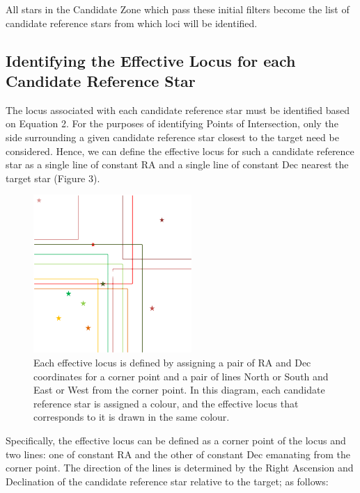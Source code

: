 \documentclass[]{elsarticle} %
\makeatletter
\def\maxwidth{\ifdim\Gin@nat@width>\linewidth\linewidth
\else\Gin@nat@width\fi}
\let\Oldincludegraphics\includegraphics
\renewcommand{\includegraphics}[1]{\Oldincludegraphics[width=\maxwidth]{#1}}
\makeatother
\begin{document}
All stars in the Candidate Zone which pass these initial filters become
the list of candidate reference stars from which loci will be
identified.

\hypertarget{identifying-the-effective-locus-for-each-candidate-reference-star}{%
\subsection{Identifying the Effective Locus for each Candidate Reference
Star}\label{identifying-the-effective-locus-for-each-candidate-reference-star}}

The locus associated with each candidate reference star must be
identified based on Equation 2. For the purposes of identifying Points
of Intersection, only the side surrounding a given candidate reference
star closest to the target need be considered. Hence, we can define the
effective locus for such a candidate reference star as a single line of
constant RA and a single line of constant Dec nearest the target star
(Figure 3).

\begin{figure}
\centering
\includegraphics{fig3.png}
\caption{Each effective locus is defined by assigning a pair
of RA and Dec coordinates for a corner point and a pair of lines North
or South and East or West from the corner point. In this diagram, each
candidate reference star is assigned a colour, and the effective locus
that corresponds to it is drawn in the same colour.}
\end{figure}

Specifically, the effective locus can be defined as a corner point of
the locus and two lines: one of constant RA and the other of constant
Dec emanating from the corner point. The direction of the lines is
determined by the Right Ascension and Declination of the candidate
reference star relative to the target; as follows:
\end{document}

